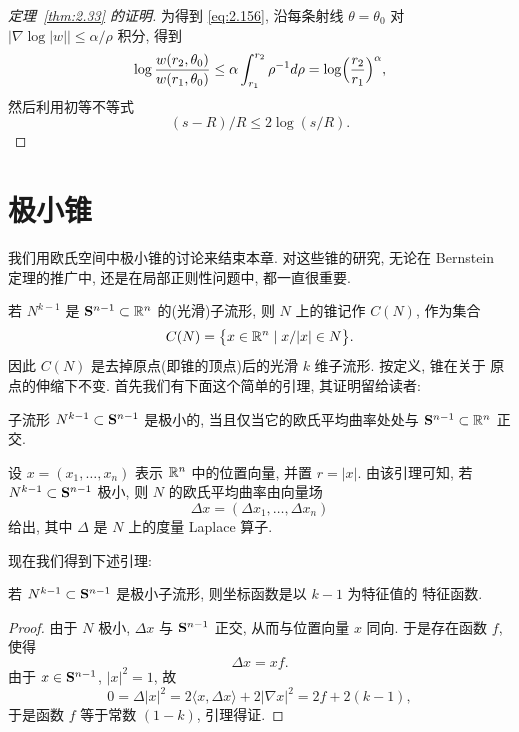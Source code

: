 \begin{proof}[定理~\ref{thm:2.33} 的证明]
为得到 \eqref{eq:2.156}, 沿每条射线 $\theta=\theta_0$ 对
$|\nabla\log|w||\leq\alpha/\rho$ 积分, 得到
\begin{equation}
\log\frac{w(r_2,\theta_0)}{w(r_1,\theta_0)}
 \leq\alpha\int_{r_1}^{r_2}\rho^{-1}d\rho
 =\log\Bigl(\frac{r_2}{r_1}\Bigr)^{\alpha},
\label{eq:2.173}
\end{equation}
然后利用初等不等式
\[
(s-R)/R\leq2\log(s/R).
\]
\end{proof}

\section{极小锥}
\label{sec:2.9}

我们用欧氏空间中极小锥的讨论来结束本章. 对这些锥的研究, 无论在 Bernstein
定理的推广中, 还是在局部正则性问题中, 都一直很重要.

若 $N^{k-1}$ 是 $\mathbf{S}^{n-1}\subset\mathbb{R}^n$ 的(光滑)子流形, 则 $N$ 上的锥记作
$C(N)$, 作为集合
\begin{equation}
C(N)=\bigl\{x\in\mathbb{R}^n\mid x/|x|\in N\bigr\}.
\label{eq:2.174}
\end{equation}
因此 $C(N)$ 是去掉原点(即锥的顶点)后的光滑 $k$ 维子流形. 按定义, 锥在关于
原点的伸缩下不变. 首先我们有下面这个简单的引理, 其证明留给读者:

\begin{lemma}
\label{lem:2.36}
子流形 $N^{k-1}\subset\mathbf{S}^{n-1}$ 是极小的, 当且仅当它的欧氏平均曲率处处与
$\mathbf{S}^{n-1}\subset\mathbb{R}^n$ 正交.
\end{lemma}

设 $x=(x_1,\dots,x_n)$ 表示 $\mathbb{R}^n$ 中的位置向量, 并置 $r=|x|$. 由该引理可知,
若 $N^{k-1}\subset\mathbf{S}^{n-1}$ 极小, 则 $N$ 的欧氏平均曲率由向量场
\begin{equation}
\Delta x=(\Delta x_1,\dots,\Delta x_n)
\label{eq:2.175}
\end{equation}
给出, 其中 $\Delta$ 是 $N$ 上的度量 Laplace 算子.

现在我们得到下述引理:

\begin{lemma}
\label{lem:2.37}
若 $N^{k-1}\subset\mathbf{S}^{n-1}$ 是极小子流形, 则坐标函数是以 $k-1$ 为特征值的
特征函数.
\end{lemma}

\begin{proof}
由于 $N$ 极小, $\Delta x$ 与 $\mathbf{S}^{n-1}$ 正交, 从而与位置向量 $x$ 同向.
于是存在函数 $f$, 使得
\begin{equation}
\Delta x=xf.
\label{eq:2.176}
\end{equation}
由于 $x\in\mathbf{S}^{n-1}$, $|x|^{2}=1$, 故
\begin{equation}
0=\Delta|x|^{2}=2\langle x,\Delta x\rangle+2|\nabla x|^{2}
 =2f+2(k-1),
\label{eq:2.177}
\end{equation}
于是函数 $f$ 等于常数 $(1-k)$, 引理得证.
\end{proof}

